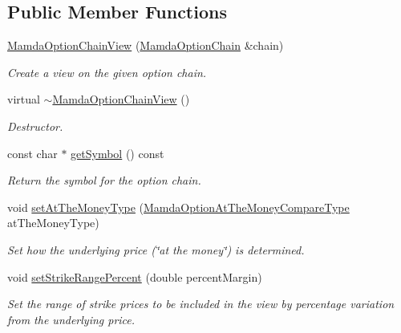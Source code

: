 \subsection*{Public Member Functions}
\begin{CompactItemize}
\item 
\hyperlink{classWombat_1_1MamdaOptionChainView_43112fa4380c42105f61f5b96f5968f2}{Mamda\-Option\-Chain\-View} (\hyperlink{classWombat_1_1MamdaOptionChain}{Mamda\-Option\-Chain} \&chain)
\begin{CompactList}\small\item\em Create a view on the given option chain. \item\end{CompactList}\item 
virtual \hyperlink{classWombat_1_1MamdaOptionChainView_d21c53ec82e1d894f5dcd8ccf4c282c7}{$\sim$Mamda\-Option\-Chain\-View} ()
\begin{CompactList}\small\item\em Destructor. \item\end{CompactList}\item 
const char $\ast$ \hyperlink{classWombat_1_1MamdaOptionChainView_061781cf7cba60ad4c6b22a4df457511}{get\-Symbol} () const 
\begin{CompactList}\small\item\em Return the symbol for the option chain. \item\end{CompactList}\item 
void \hyperlink{classWombat_1_1MamdaOptionChainView_007f361ace810f89307a2546432fe00f}{set\-At\-The\-Money\-Type} (\hyperlink{namespaceWombat_a07b06a78fb02e1f93ee37a2d944c33a}{Mamda\-Option\-At\-The\-Money\-Compare\-Type} at\-The\-Money\-Type)
\begin{CompactList}\small\item\em Set how the underlying price (\char`\"{}at the money\char`\"{}) is determined. \item\end{CompactList}\item 
void \hyperlink{classWombat_1_1MamdaOptionChainView_c76bb8a0940dbb60297010fb3e8504a6}{set\-Strike\-Range\-Percent} (double percent\-Margin)
\begin{CompactList}\small\item\em Set the range of strike prices to be included in the view by percentage variation from the underlying price. \item\end{CompactList}\item 

\end{CompactItemize}
